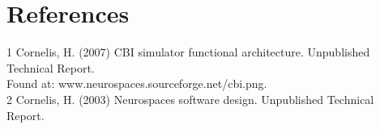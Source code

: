 \documentclass[12pt]{article}
\begin{document}

\section{References}
1 Cornelis, H. (2007) CBI simulator functional architecture. Unpublished Technical Report.\\
\hspace*{1cm} Found at: www.neurospaces.sourceforge.net/cbi.png.\\
2 Cornelis, H. (2003) Neurospaces software design. Unpublished Technical Report.

%
%
\end{document}
